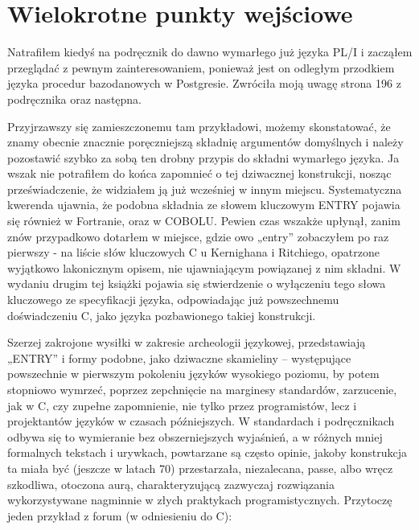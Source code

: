 \section{Wielokrotne punkty wejściowe}
Natrafiłem kiedyś na podręcznik do dawno wymarłego już języka PL/I i zacząłem przeglądać z pewnym zainteresowaniem, ponieważ jest on odległym przodkiem języka procedur bazodanowych w Postgresie. Zwróciła moją uwagę strona 196 z podręcznika\cite{plif} oraz następna.

Przyjrzawszy się zamieszczonemu tam przykładowi, możemy skonstatować, że znamy obecnie znacznie poręczniejszą składnię argumentów domyślnych i należy pozostawić szybko za sobą ten drobny przypis do składni wymarłego języka. Ja wszak nie potrafiłem do końca zapomnieć o tej dziwacznej konstrukcji, nosząc przeświadczenie, że widziałem ją już wcześniej w innym miejscu. Systematyczna kwerenda ujawnia, że podobna składnia ze słowem kluczowym ENTRY pojawia się również w Fortranie\cite[str.~120]{bielecki}, oraz w COBOLU\cite{ibm_manual_on_ENTRY_in_COBOL}. Pewien czas wszakże upłynął, zanim znów przypadkowo dotarłem w miejsce, gdzie owo „entry” zobaczyłem po raz pierwszy -  na liście słów kluczowych C u Kernighana i Ritchiego, opatrzone wyjątkowo lakonicznym opisem, nie ujawniającym powiązanej z nim składni\cite[str.~120]{KiR}.
W wydaniu drugim tej książki pojawia się stwierdzenie o wyłączeniu tego słowa kluczowego ze specyfikacji języka\cite[rozdz.~A2.4,~str.192]{KiR2}, odpowiadając już powszechnemu doświadczeniu C, jako języka pozbawionego takiej konstrukcji.

Szerzej zakrojone wysiłki w zakresie archeologii językowej, przedstawiają „ENTRY” i formy podobne, jako dziwaczne skamieliny – występujące powszechnie w pierwszym pokoleniu języków wysokiego poziomu, by potem stopniowo wymrzeć, poprzez zepchnięcie na marginesy standardów, zarzucenie, jak w C, czy zupełne zapomnienie, nie tylko przez programistów, lecz i projektantów języków w czasach późniejszych. W standardach i podręcznikach odbywa się to wymieranie bez obszerniejszych wyjaśnień, a w różnych mniej formalnych tekstach i urywkach, powtarzane są często opinie, jakoby konstrukcja ta miała być (jeszcze w latach 70) przestarzała, niezalecana,  passe, albo wręcz szkodliwa, otoczona aurą, charakteryzującą zazwyczaj rozwiązania wykorzystywane nagminnie w złych praktykach programistycznych. Przytoczę jeden przykład z forum (w odniesieniu do C):

